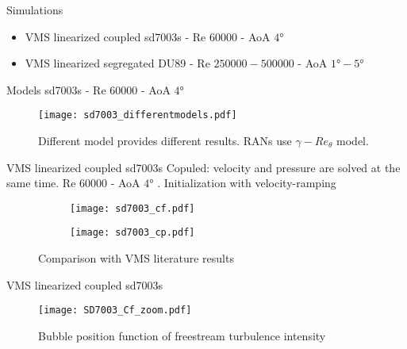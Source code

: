 



\begin{frame}{Simulations}
\begin{itemize}
\item VMS linearized coupled sd7003s - Re $\num{60000}$ - AoA $\ang{4}$ 
\item VMS linearized segregated DU89 - Re $\num{250000}-\num{500000}$ - AoA $\ang{1}-\ang{5}$ 
\end{itemize}
\end{frame}

\begin{frame}{Models}
sd7003s - Re $\num{60000}$ - AoA $\ang{4}$ 
\begin{figure}[h]
     \centering          
         \texttt{[image:  sd7003\_differentmodels.pdf]}
         \caption{Different model provides different results. RANs use $\gamma -Re_ \theta$ model.}
     \end{figure} 
\end{frame}

\begin{frame}{VMS linearized coupled sd7003s}
Copuled: velocity and pressure are solved at the same time.
Re $\num{60000}$ - AoA $\ang{4}$ . Initialization with velocity-ramping
\begin{figure}[h]
     \centering          
     \begin{subfigure}[h]{0.45\textwidth}
              \centering
         \texttt{[image: sd7003\_cf.pdf]}
    \end{subfigure}
          \hfill
     \begin{subfigure}[h]{0.45\textwidth}
      \centering
         \texttt{[image: sd7003\_cp.pdf]}
     \end{subfigure}
\caption{Comparison with VMS literature results}
     \end{figure} 
     
\end{frame}

\begin{frame}{ VMS linearized coupled sd7003s}
\begin{figure}[h]
     \centering          
         \texttt{[image: SD7003\_Cf\_zoom.pdf]}
         \caption{Bubble position function of freestream turbulence intensity}
     \end{figure} 
\end{frame}




